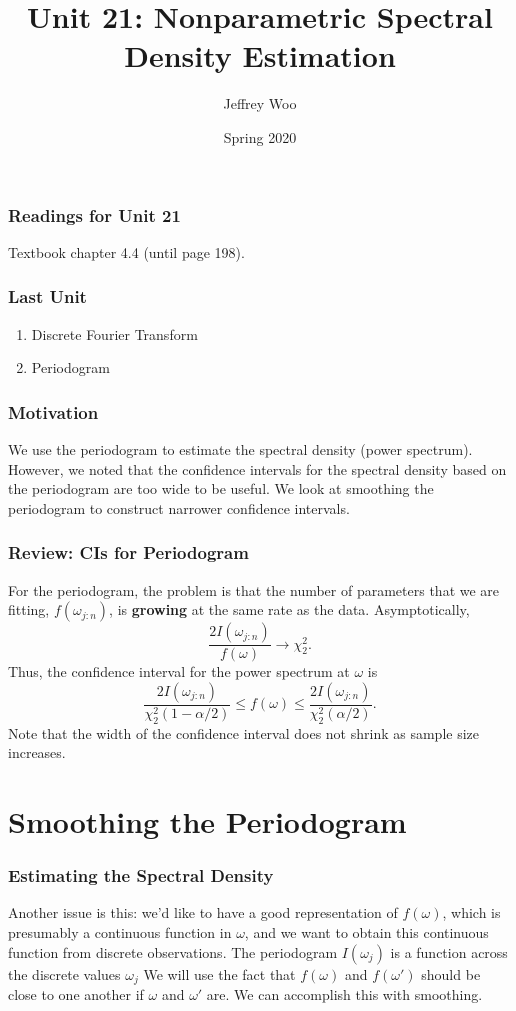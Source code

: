 \documentclass[%
xcolor=pdftex]{beamer}
\title{Unit 21: Nonparametric Spectral Density Estimation}
\author[STAT 5170: Applied Time Series, Unit 21]{Jeffrey Woo}
\institute{Department of Statistics, University of Virginia}
\date{Spring 2020}
\begin{document}
\frame{\titlepage}


\begin{frame}
\frametitle{Readings for Unit 21}

Textbook chapter 4.4 (until page 198).

\end{frame}


\begin{frame}
\frametitle{Last Unit}
\begin{enumerate}
\item Discrete Fourier Transform
\item Periodogram
\end{enumerate}
\end{frame}

\begin{frame}
\frametitle{Motivation}

We use the periodogram to estimate the spectral density (power spectrum). However, we noted that the confidence intervals for the spectral density based on the periodogram are too wide to be useful. We look at smoothing the periodogram to construct narrower confidence intervals.


\end{frame}

\begin{frame}
\frametitle{Review: CIs for Periodogram}

For the periodogram,  the problem is that the number of parameters that we are fitting, $f(\omega_{j:n})$, is \textbf{growing} at the same rate as the data. Asymptotically,
$$
\frac{2 I(\omega_{j:n}) }{f(\omega)} \rightarrow \chi_2^2.
$$
Thus, the confidence interval for the power spectrum at $\omega$ is
$$
\frac{2 I(\omega_{j:n}) }{\chi_2^2(1-\alpha/2)} \leq f(\omega) \leq \frac{2 I(\omega_{j:n}) }{\chi_2^2(\alpha/2)}.
$$
Note that the width of the confidence interval does not shrink as sample size increases.

\end{frame}





\section{Smoothing the Periodogram}
\frame{\tableofcontents[currentsection]}

\begin{frame}
\frametitle{Estimating the Spectral Density}

Another issue is this: we'd like to have a
good representation of $f(\omega)$, which is presumably a
continuous function in $\omega$, and we want to obtain this
continuous function from discrete observations. The periodogram $I(\omega_j)$ is a function across the discrete
values $\omega_j$  We will use the fact that $f(\omega)$
and $f(\omega')$ should be close to one another if $\omega$ and
$\omega'$ are.  We can accomplish this with smoothing.

\end{frame}
\end{document}
